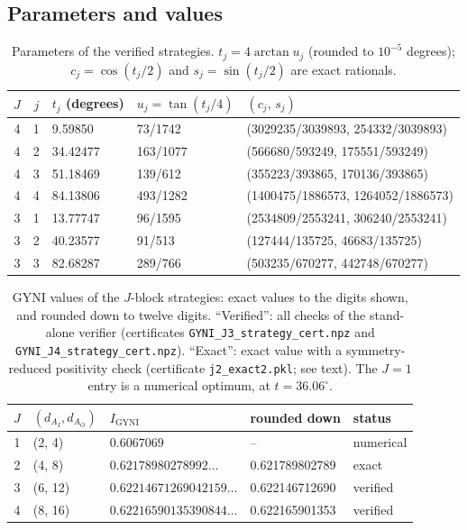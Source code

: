 \documentclass[aps,pra,onecolumn,notitlepage,superscriptaddress,longbibliography,nofootinbib,11pt]{revtex4-2}
\theoremstyle{remark}
\newcommand{\Igy}{I_{\mathrm{GYNI}}}
\newcommand{\file}[1]{\texttt{#1}}
\begin{document}
\subsection{Parameters and values}

\begin{table}[h]
\caption{Parameters of the verified strategies. $t_j=4\arctan u_j$ (rounded to $10^{-5}$ degrees); $c_j=\cos(t_j/2)$ and $s_j=\sin(t_j/2)$ are exact rationals.}
\label{tab:S-params}
\begin{ruledtabular}
\begin{tabular}{cclll}
$J$ & $j$ & $t_j$ (degrees) & $u_j=\tan(t_j/4)$ & $(c_j,\,s_j)$\\
\hline
4 & 1 & 9.59850  & 73/1742  & (3029235/3039893, 254332/3039893)\\
4 & 2 & 34.42477 & 163/1077 & (566680/593249, 175551/593249)\\
4 & 3 & 51.18469 & 139/612  & (355223/393865, 170136/393865)\\
4 & 4 & 84.13806 & 493/1282 & (1400475/1886573, 1264052/1886573)\\
\hline
3 & 1 & 13.77747 & 96/1595  & (2534809/2553241, 306240/2553241)\\
3 & 2 & 40.23577 & 91/513   & (127444/135725, 46683/135725)\\
3 & 3 & 82.68287 & 289/766  & (503235/670277, 442748/670277)\\
\end{tabular}
\end{ruledtabular}
\end{table}

\begin{table}[h]
\caption{GYNI values of the $J$-block strategies: exact values to the digits shown, and rounded down to twelve digits. ``Verified'': all checks of the stand-alone verifier (certificates \file{GYNI\_J3\_strategy\_cert.npz} and \file{GYNI\_J4\_strategy\_cert.npz}). ``Exact'': exact value with a symmetry-reduced positivity check (certificate \file{j2\_exact2.pkl}; see text). The $J=1$ entry is a numerical optimum, at $t=36.06^\circ$.}
\label{tab:S-values}
\footnotesize
\begin{ruledtabular}
\begin{tabular}{cllll}
$J$ & $(d_{A_I},d_{A_O})$ & $\Igy$ & rounded down & status\\
\hline
1 & (2, 4)   & $0.6067069$ & -- & numerical\\
2 & (4, 8)   & $0.62178980278992\ldots$ & 0.621789802789 & exact\\
3 & (6, 12)  & $0.62214671269042159\ldots$ & 0.622146712690 & verified\\
4 & (8, 16)  & $0.62216590135390844\ldots$ & 0.622165901353 & verified\\
\end{tabular}
\end{ruledtabular}
\end{table}
\end{document}
